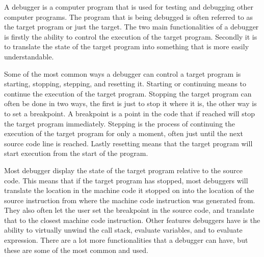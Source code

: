 


A debugger is a computer program that is used for testing and debugging other computer programs.
The program that is being debugged is often referred to as the target program or just the target.
The two main functionalities of a debugger is firstly the ability to control the execution of the target program.
Secondly it is to translate the state of the target program into something that is more easily understandable.


Some of the most common ways a debugger can control a target program is starting, stopping, stepping, and resetting it.
Starting or continuing means to continue the execution of the target program.
Stopping the target program can often be done in two ways, the first is just to stop it where it is, the other way is to set a breakpoint.
A breakpoint is a point in the code that if reached will stop the target program immediately.
Stepping is the process of continuing the execution of the target program for only a moment, often just until the next source code line is reached.
Lastly resetting means that the target program will start execution from the start of the program.


Most debugger display the state of the target program relative to the source code.
This means that if the target program has stopped, most debuggers will translate the location in the machine code it stopped on into the location of the source instruction from where the machine code instruction was generated from.
They also often let the user set the breakpoint in the source code, and translate that to the closest machine code instruction.
Other features debuggers have is the ability to virtually unwind the call stack, evaluate variables, and to evaluate expression.
There are a lot more functionalities that a debugger can have, but these are some of the most common and used.

